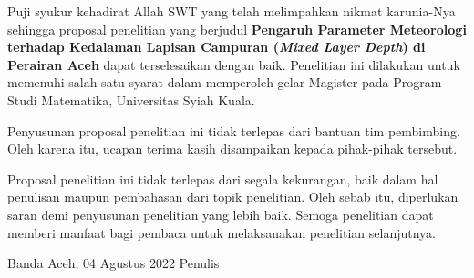 \begin{spacing}{1.5}
	\pagestyle{empty}
	
	\vskip 1cm
	\par Puji syukur kehadirat Allah SWT yang telah melimpahkan nikmat karunia-Nya sehingga proposal penelitian yang berjudul \textbf{Pengaruh Parameter Meteorologi terhadap Kedalaman Lapisan Campuran (\textit{Mixed Layer Depth}) di Perairan Aceh} dapat terselesaikan dengan baik. Penelitian ini dilakukan untuk memenuhi salah satu syarat dalam memperoleh gelar Magister pada Program Studi Matematika, Universitas Syiah Kuala.
	\par Penyusunan proposal penelitian ini tidak terlepas dari bantuan tim pembimbing. Oleh karena itu, ucapan terima  kasih disampaikan kepada pihak-pihak tersebut.
	\par Proposal penelitian ini tidak terlepas dari segala kekurangan, baik dalam hal penulisan maupun pembahasan dari topik penelitian. Oleh sebab itu, diperlukan saran demi penyusunan penelitian yang lebih baik. Semoga penelitian dapat memberi manfaat bagi pembaca untuk melaksanakan penelitian selanjutnya.
	\vskip 1cm  
	\begin{flushright}
		Banda Aceh, 04 Agustus 2022
		\vskip 2cm
		Penulis	
	\end{flushright}
\end{spacing}
\pagestyle{empty}